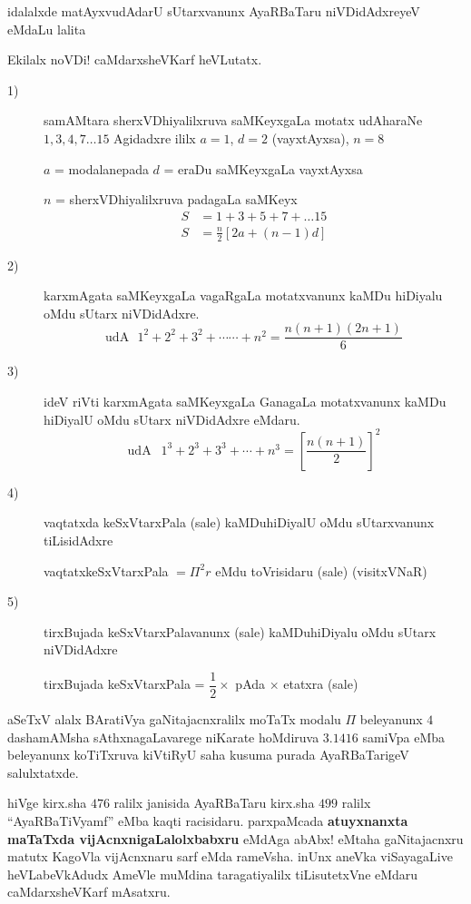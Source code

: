 idalalxde matAyxvudAdarU sUtarxvanunx AyaRBaTaru niVDidAdxreyeV eMdaLu lalita

Ekilalx noVDi! caMdarxsheVKarf heVLutatx.
\begin{description}
\item[{\rm 1})] samAMtara sherxVDhiyalilxruva saMKeyxgaLa motatx udAharaNe $1, 3, 4, 7 \ldots 15$ Agidadxre ililx $a=1$, $d=2$ (vayxtAyxsa), $n=8$

  $a$ = modalanepada $d$ = eraDu saMKeyxgaLa vayxtAyxsa

  $n$ = sherxVDhiyalilxruva padagaLa saMKeyx
  \begin{align*}
    S &= 1+3+5+7+ \ldots 15\\
    S &= \frac{n}{2} \left[2a+(n-1)d \right]
  \end{align*}

\item[{\rm 2})] karxmAgata saMKeyxgaLa vagaRgaLa motatxvanunx kaMDu hiDiyalu oMdu sUtarx niVDidAdxre.
  $$
\text{udA} ~~~ 1^2 + 2^2 + 3^2 + \cdots \cdots + n^2 = \frac{n (n+1) (2n+1)}{6}
$$

\item[{\rm 3})] ideV riVti karxmAgata saMKeyxgaLa GanagaLa motatxvanunx kaMDu hiDiyalU oMdu sUtarx niVDidAdxre eMdaru.
$$
\text{udA } ~~1^3 +2^3+3^3 + \cdots +n^3 = \left[\frac{n(n+1)}{2}\right]^2
$$

\item[{\rm 4})] vaqtatxda keSxVtarxPala (sale) kaMDuhiDiyalU oMdu sUtarxvanunx tiLisidAdxre

  vaqtatxkeSxVtarxPala $=\Pi^2 r$ eMdu toVrisidaru (sale) (visitxVNaR)
   

\item[{\rm 5})] tirxBujada keSxVtarxPalavanunx (sale) kaMDuhiDiyalu oMdu sUtarx niVDidAdxre

  tirxBujada keSxVtarxPala = $\dfrac{1}{2} \times $ pAda $\times$ etatxra (sale)
\end{description}

aSeTxV alalx BAratiVya gaNitajacnxralilx moTaTx modalu $\Pi$ beleyanunx $4$ dashamAMsha sAthxnagaLavarege niKarate hoMdiruva $3.1416$ samiVpa eMba beleyanunx koTiTxruva kiVtiRyU saha kusuma purada AyaRBaTarigeV salulxtatxde.

hiVge kirx.sha $476$ ralilx janisida AyaRBaTaru kirx.sha $499$ ralilx ``AyaRBaTiVyamf'' eMba kaqti racisidaru. parxpaMcada {\bf atuyxnanxta maTaTxda vijAcnxnigaLalolxbabxru} eMdAga abAbx! eMtaha gaNitajacnxru matutx KagoVla vijAcnxnaru sarf eMda rameVsha. inUnx aneVka viSayagaLive heVLabeVkAdudx AmeVle muMdina taragatiyalilx tiLisutetxVne eMdaru caMdarxsheVKarf mAsatxru.

